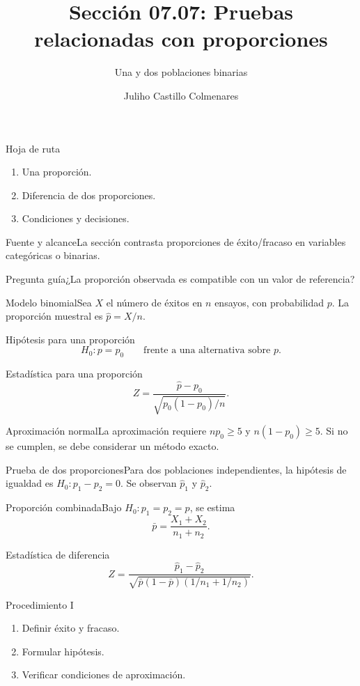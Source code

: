 \documentclass[10pt,aspectratio=169]{beamer}
\title[Pruebas de proporciones]{Sección 07.07: Pruebas relacionadas con proporciones}\subtitle{Una y dos poblaciones binarias}
\author[J. Castillo Colmenares]{Juliho Castillo Colmenares}\institute{Tecnológico de Monterrey}\date{}
\begin{document}
\begin{frame}[plain]\titlepage\end{frame}
\begin{frame}{Hoja de ruta}\small\begin{enumerate}\item Una proporción.\item Diferencia de dos proporciones.\item Condiciones y decisiones.\end{enumerate}\end{frame}
\begin{frame}{Fuente y alcance}\small La sección contrasta proporciones de éxito/fracaso en variables categóricas o binarias.\begin{block}{Pregunta guía}¿La proporción observada es compatible con un valor de referencia?\end{block}\end{frame}
\begin{frame}{Modelo binomial}\small Sea $X$ el número de éxitos en $n$ ensayos, con probabilidad $p$. La proporción muestral es $\hat p=X/n$.\end{frame}
\begin{frame}{Hipótesis para una proporción}\small\[H_0:p=p_0\qquad\text{frente a una alternativa sobre }p.\]\end{frame}
\begin{frame}{Estadística para una proporción}\small\[Z=\frac{\hat p-p_0}{\sqrt{p_0(1-p_0)/n}}.\]\end{frame}
\begin{frame}{Aproximación normal}\small La aproximación requiere $np_0\geq5$ y $n(1-p_0)\geq5$. Si no se cumplen, se debe considerar un método exacto.\end{frame}
\begin{frame}{Prueba de dos proporciones}\small Para dos poblaciones independientes, la hipótesis de igualdad es $H_0:p_1-p_2=0$. Se observan $\hat p_1$ y $\hat p_2$.\end{frame}
\begin{frame}{Proporción combinada}\small Bajo $H_0:p_1=p_2=p$, se estima\[\bar p=\frac{X_1+X_2}{n_1+n_2}.\]\end{frame}
\begin{frame}{Estadística de diferencia}\small\[Z=\frac{\hat p_1-\hat p_2}{\sqrt{\bar p(1-\bar p)(1/n_1+1/n_2)}}.\]\end{frame}
\begin{frame}{Procedimiento I}\small\begin{enumerate}\item Definir éxito y fracaso.\item Formular hipótesis.\item Verificar condiciones de aproximación.\end{enumerate}\end{frame}
\end{document}
